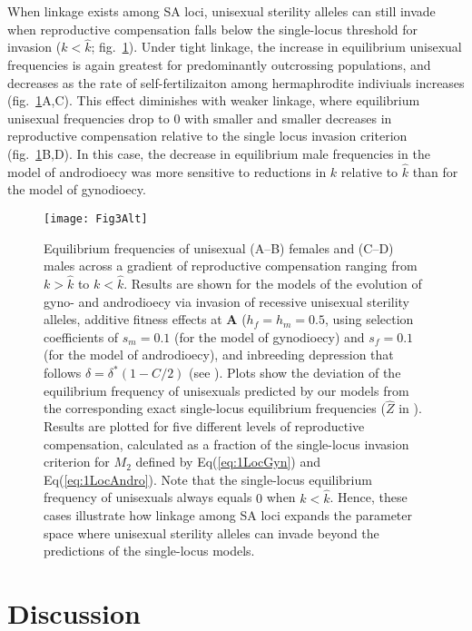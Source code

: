 \documentclass[9pt,twocolumn,twoside,lineno]{gsajnl}
\begin{document}
When linkage exists among SA loci, unisexual sterility alleles can still invade when reproductive compensation falls below the single-locus threshold for invasion ($k < \hat{k}$; fig.~\ref{fig:eqFreq}). Under tight linkage, the increase in equilibrium unisexual frequencies is again greatest for predominantly outcrossing populations, and decreases as the rate of self-fertilizaiton among hermaphrodite indiviuals increases (fig.~\ref{fig:eqFreq}A,C). This effect diminishes with weaker linkage, where equilibrium unisexual frequencies drop to $0$ with smaller and smaller decreases in reproductive compensation relative to the single locus invasion criterion (fig.~\ref{fig:eqFreq}B,D). In this case, the decrease in equilibrium male frequencies in the model of androdioecy was more sensitive to reductions in $k$ relative to $\hat{k}$ than for the model of gynodioecy.


\begin{figure}[htbp]
\centering
\texttt{[image: Fig3Alt]}
\caption{Equilibrium frequencies of unisexual (A--B) females and (C--D) males across a gradient of reproductive compensation ranging from $k > \hat{k}$ to $k < \hat{k}$. Results are shown for the models of the evolution of gyno- and androdioecy via invasion of recessive unisexual sterility alleles, additive fitness effects at $\mathbf{A}$ ($h_f = h_m = 0.5$, using selection coefficients of $s_m = 0.1$ (for the model of gynodioecy) and $s_f = 0.1$ (for the model of androdioecy), and inbreeding depression that follows $\delta = \delta^\ast(1 - C/2)$ (see ). Plots show the deviation of the equilibrium frequency of unisexuals predicted by our models from the corresponding exact single-locus equilibrium frequencies ($\hat{Z}$ in \citealt{Charlesworth1978a}). Results are plotted for five different levels of reproductive compensation, calculated as a fraction of the single-locus invasion criterion for $M_2$ defined by Eq(\ref{eq:1LocGyn}) and Eq(\ref{eq:1LocAndro}). Note that the single-locus equilibrium frequency of unisexuals always equals $0$ when $k < \hat{k}$. Hence, these cases illustrate how linkage among SA loci expands the parameter space where unisexual sterility alleles can invade beyond the predictions of the single-locus models.}
\label{fig:eqFreq}
\end{figure}


\section{Discussion}
\end{document}
